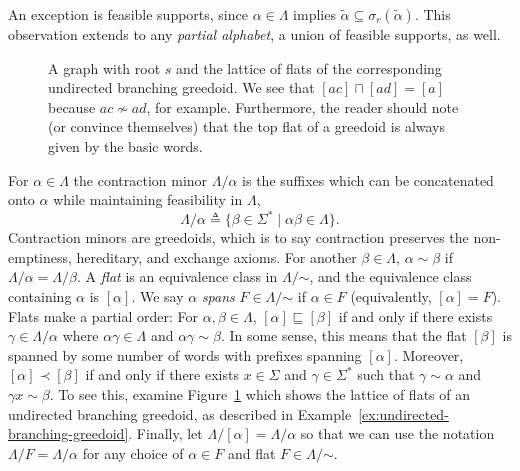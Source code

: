 \documentclass[11pt]{article}
\newcommand{\univ}{\Sigma}
\newcommand{\glang}{\Lambda}
\begin{document}
An exception is feasible supports, since $\alpha\in\glang$ implies $\widetilde{\alpha}\subseteq\sigma_r(\widetilde{\alpha})$.
This observation extends to any \emph{partial alphabet}, a union of feasible supports, as well.

\begin{figure}[t!]
    \centering
    \hfil
    \caption{A graph with root $s$ and the lattice of flats of the corresponding undirected branching greedoid. We see that $[ac]\sqcap[ad] = [a]$ because $ac \not\sim ad$, for example. Furthermore, the reader should note (or convince themselves) that the top flat of a greedoid is always given by the basic words. 
    }\label{fig:ubg}
\end{figure}

For $\alpha \in \glang$ the contraction minor $\glang/\alpha$ is the suffixes which can be concatenated onto $\alpha$ while maintaining feasibility in $\glang$,
\[
    \glang/\alpha \triangleq \{\beta \in \univ^*\mid \alpha\beta \in \glang\}.
\]
Contraction minors are greedoids, which is to say contraction preserves the non-emptiness, hereditary, and exchange axioms.
For another $\beta \in \glang$, $\alpha \sim \beta$ if $\glang/\alpha = \glang/\beta$.
A \emph{flat} is an equivalence class in $\glang/\mathord{\sim}$, and the equivalence class containing $\alpha$ is $[\alpha]$.
We say $\alpha$ \emph{spans} $F \in \glang/\mathord{\sim}$ if $\alpha \in F$ (equivalently, $[\alpha] = F$).
Flats make a partial order: For $\alpha,\beta\in\glang$, $[\alpha] \sqsubseteq [\beta]$ if and only if there exists $\gamma\in\glang/\alpha$ where $\alpha \gamma\in\glang$ and $\alpha \gamma \sim \beta$.
In some sense, this means that the flat $[\beta]$ is spanned by some number of words with prefixes spanning $[\alpha]$.
Moreover, $[\alpha]\prec[\beta]$ if and only if there exists $x\in\univ$ and $\gamma \in \univ^*$ such that $\gamma \sim \alpha$ and $\gamma x \sim \beta$.
To see this, examine Figure~\ref{fig:ubg} which shows the lattice of flats of an undirected branching greedoid, as described in Example~\ref{ex:undirected-branching-greedoid}.
Finally, let $\glang/[\alpha] = \glang/\alpha$ so that we can use the notation $\glang/F = \glang/\alpha$ for any choice of $\alpha \in F$ and flat $F\in\glang/\mathord{\sim}$.
\end{document}
